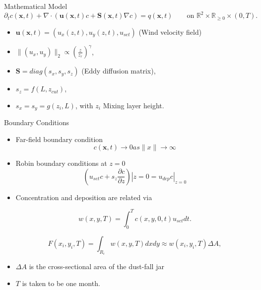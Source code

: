 \documentclass[11pt]{beamer}
\theoremstyle{plain}
\theoremstyle{definition}
\begin{document}
\begin{frame}{Mathematical Model}
\begin{equation*}
\partial_{t} c(\textbf{x},t)+\nabla\cdot(\textbf{u}(\textbf{x},t)c+\textbf{S}(\textbf{x},t)\nabla c)
=q(\textbf{x},t)\qquad\text{on }\mathbb{R}^{2}\times\mathbb{R}_{\geq 0}\times(0,T).
\end{equation*}
\begin{itemize}
\item $\textbf{u}(\textbf{x},t)=(u_{x}(z,t),u_{y}(z,t),u_{set})$ 
(Wind velocity field)
\item $\|(u_{x},u_{y})\|_{2}\propto\left(\frac{z}{z_{r}}\right)^{\gamma}$,
\item $\textbf{S}=diag(s_{x},s_{y},s_{z})$ (Eddy diffusion matrix),
\item $s_{z}=f(L,z_{cut})$,
\item $s_{x}=s_{y}=g(z_{i},L)$, with $z_{i}$ Mixing layer height.
\end{itemize}
\end{frame}



\begin{frame}{Boundary Conditions}

\begin{itemize}
\item Far-field boundary condition
\begin{equation*}
c(\textbf{x},t)\rightarrow 0 as \|x\|\rightarrow \infty
\end{equation*}

\item Robin boundary conditions at $z=0$
\begin{equation*}
\left(u_{set}c+s_{z}\frac{\partial c}{\partial z}\right)|{z=0}=u_{dep}c|_{z=0}
\end{equation*}


\end{itemize}
\end{frame}


\begin{frame}


\begin{itemize}
\item Concentration and deposition are related via

\begin{equation}\label{eqnw}
w(x,y,T)=\int_{0}^{T}c(x,y,0,t)u_{set}dt.
\end{equation}

\begin{equation*}
F(x_{i},y_{i},T)=\int_{R_{i}}w(x,y,T)dxdy\approx w(x_{i},y_{i},T)\Delta A,
\end{equation*}
\item $\Delta A$ is the cross-sectional area of the dust-fall jar
\item $T$ is taken to be one month.
\end{itemize}

\end{frame}
\end{document}

